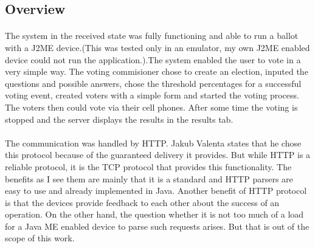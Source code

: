 \documentclass[11pt,twoside,a4paper]{book}
\begin{document}
\subsection{Overview}
\paragraph{}
The system in the received state was fully functioning and able to run a ballot with a J2ME device.(This was tested only in an emulator, my own J2ME enabled device could not run the application.).The system enabled the user to vote in a very simple way. The voting commisioner chose to create an election, inputed the questions and possible answers, chose the threshold percentages for a successful voting event, created voters with a simple form and started the voting process. The voters then could vote via their cell phones. After some time the voting is stopped and the server displays the results in the results tab. \paragraph{}
The communication was handled by HTTP. Jakub Valenta\cite{bakalarkaJV} states that he chose this protocol because of the guaranteed delivery it provides. But while HTTP is a reliable protocol, it is the TCP protocol that provides this functionality. The benefits as I see them are mainly that it is a standard and HTTP parsers are easy to use and already implemented in Java. Another benefit of HTTP protocol is that the devices provide feedback to each other about the success of an operation. On the other hand, the question whether it is not too much of a load for a Java ME enabled device to parse such requests arises. But that is out of the scope of this work.
\end{document}
